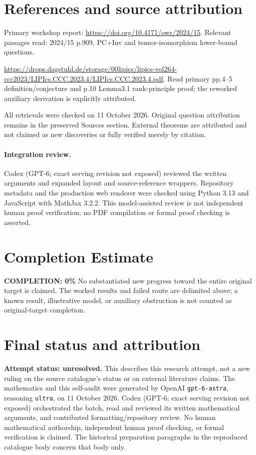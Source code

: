 \documentclass[11pt]{article}
\begin{document}
\section{References and source attribution}
Primary workshop report: \url{https://doi.org/10.4171/owr/2024/15}. Relevant passages read: 2024/15 p.909, PC+Inv and tensor-isomorphism lower-bound questions.

\url{https://drops.dagstuhl.de/storage/00lipics/lipics-vol264-ccc2023/LIPIcs.CCC.2023.4/LIPIcs.CCC.2023.4.pdf}. Read primary pp.4--5 definition/conjecture and p.10 Lemma3.1 rank-principle proof; the reworked auxiliary derivation is explicitly attributed.

All retrievals were checked on 11 October 2026. Original question attribution remains in the preserved Sources section. External theorems are attributed and not claimed as new discoveries or fully verified merely by citation.


\paragraph{Integration review.} Codex (GPT-6; exact serving revision not exposed) reviewed the written arguments and expanded layout and source-reference wrappers. Repository metadata and the production web renderer were checked using Python 3.13 and JavaScript with MathJax 3.2.2. This model-assisted review is not independent human proof verification; no PDF compilation or formal proof checking is asserted.

\section{Completion Estimate}
\noindent\textbf{COMPLETION: 0\%}
No substantiated new progress toward the entire original target is claimed. The worked results and failed route are delimited above; a known result, illustrative model, or auxiliary obstruction is not counted as original-target completion.

\section{Final status and attribution}
\textbf{Attempt status: unresolved.} This describes this research attempt, not a new ruling on the source catalogue's status or on external literature claims.
The mathematics and this self-audit were generated by OpenAI \texttt{gpt-6-astra}, reasoning \texttt{ultra}, on 11 October 2026. Codex (GPT-6; exact serving revision not exposed) orchestrated the batch, read and reviewed its written mathematical arguments, and contributed formatting/repository review. No human mathematical authorship, independent human proof checking, or formal verification is claimed. The historical preparation paragraphs in the reproduced catalogue body concern that body only.
\end{document}

